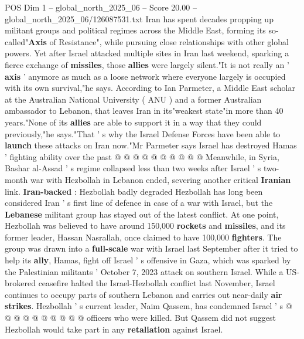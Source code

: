 \begin{textsample}{POS Dim 1 – global\_north\_2025\_06 – Score 20.00 – global\_north\_2025\_06/126087531.txt}  \label{ex:f1_pos_338}
Iran has spent decades propping up militant groups and political regimes across the Middle East, forming its so-called"\textbf{Axis} of Resistance", while pursuing close relationships with other global powers.
Yet after Israel attacked multiple sites in Iran last weekend, sparking a fierce exchange of \textbf{missiles}, those \textbf{allies} were largely silent."It is not really an ' \textbf{axis} ' anymore as much as a loose network where everyone largely is occupied with its own survival,"he says.
According to Ian Parmeter, a Middle East scholar at the Australian National University ( ANU ) and a former Australian ambassador to Lebanon, that leaves Iran in its"weakest state"in more than 40 years."None of its \textbf{allies} are able to support it in a way that they could previously,"he says."That ' s why the Israel Defense Forces have been able to \textbf{launch} these attacks on Iran now."Mr Parmeter says Israel has destroyed Hamas ' fighting ability over the past @ @ @ @ @ @ @ @ @ @ Meanwhile, in Syria, Bashar al-Assad ' s regime collapsed less than two weeks after Israel ' s two-month war with Hezbollah in Lebanon ended, severing another critical \textbf{Iranian} link. \textbf{Iran-backed} : Hezbollah badly degraded Hezbollah has long been considered Iran ' s first line of defence in case of a war with Israel, but the \textbf{Lebanese} militant group has stayed out of the latest conflict.
At one point, Hezbollah was believed to have around 150,000 \textbf{rockets} and \textbf{missiles}, and its former leader, Hassan Nasrallah, once claimed to have 100,000 \textbf{fighters}.
The group was drawn into a \textbf{full-scale} war with Israel last September after it tried to help its \textbf{ally}, Hamas, fight off Israel ' s offensive in Gaza, which was sparked by the Palestinian militants ' October 7, 2023 attack on southern Israel.
While a US-brokered ceasefire halted the Israel-Hezbollah conflict last November, Israel continues to occupy parts of southern Lebanon and carries out near-daily \textbf{air} \textbf{strikes}.
Hezbollah ' s current leader, Naim Qassem, has condemned Israel ' s @ @ @ @ @ @ @ @ @ @ officers who were killed.
But Qassem did not suggest Hezbollah would take part in any \textbf{retaliation} against Israel.

\end{textsample}
